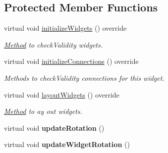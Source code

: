 \subsection*{Protected Member Functions}
\begin{DoxyCompactItemize}
\item 
\mbox{\label{classrev_1_1_view_1_1_rotation_widget_af43a0d84701cd34ea7a96fc7f887bcb7}} 
virtual void \mbox{\hyperlink{classrev_1_1_view_1_1_rotation_widget_af43a0d84701cd34ea7a96fc7f887bcb7}{initialize\+Widgets}} () override
\begin{DoxyCompactList}\small\item\em \mbox{\hyperlink{struct_method}{Method}} to check\+Validity widgets. \end{DoxyCompactList}\item 
\mbox{\label{classrev_1_1_view_1_1_rotation_widget_a4e259c3f4d2cab7980a30b3b942a9d1b}} 
virtual void \mbox{\hyperlink{classrev_1_1_view_1_1_rotation_widget_a4e259c3f4d2cab7980a30b3b942a9d1b}{initialize\+Connections}} () override
\begin{DoxyCompactList}\small\item\em Methods to check\+Validity connections for this widget. \end{DoxyCompactList}\item 
\mbox{\label{classrev_1_1_view_1_1_rotation_widget_a11648d70c46ea9831f75e0e7c58f1020}} 
virtual void \mbox{\hyperlink{classrev_1_1_view_1_1_rotation_widget_a11648d70c46ea9831f75e0e7c58f1020}{layout\+Widgets}} () override
\begin{DoxyCompactList}\small\item\em \mbox{\hyperlink{struct_method}{Method}} to ay out widgets. \end{DoxyCompactList}\item 
\mbox{\label{classrev_1_1_view_1_1_rotation_widget_acab10a9bc1fc9f971dedca0e18d3aaec}} 
virtual void {\bfseries update\+Rotation} ()
\item 
\mbox{\label{classrev_1_1_view_1_1_rotation_widget_a4e5ee2b87d549ce65668ee415e70cc00}} 
virtual void {\bfseries update\+Widget\+Rotation} ()
\item 

\end{DoxyCompactItemize}
